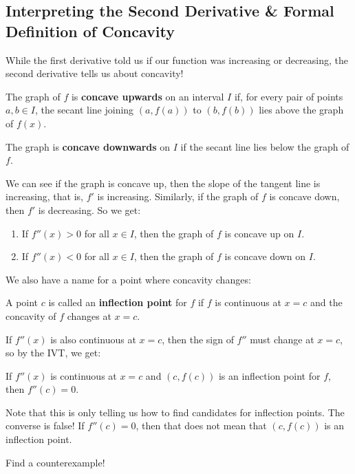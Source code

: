 \subsection{Interpreting the Second Derivative \& Formal Definition of Concavity}
While the first derivative told us if our function was increasing or decreasing, the
second derivative tells us about concavity!
\begin{Definition}{}{}
    The graph of $ f $ is \textbf{concave upwards} on an interval $ I $ if,
    for every pair of points $ a,b\in I $, the secant line joining
    $ (a,f(a)) $ to $ (b,f(b)) $
    lies above the graph of $ f(x) $.

    The graph is \textbf{concave downwards} on $ I $ if the secant line lies below the graph of $ f $.
\end{Definition}
We can see if the graph is concave up, then the slope of the tangent line is increasing, that is, $ f' $
is increasing. Similarly, if the graph of $ f $ is concave down, then $ f' $ is decreasing. So we get:
\begin{Theorem}{}{}
    \begin{enumerate}[(1)]
        \item If $ f''(x)>0 $ for all $ x\in I $, then the graph of $ f $ is concave up on $ I $.
        \item If $ f''(x)<0 $ for all $ x\in I $, then the graph of $ f $ is concave down on $ I $.
    \end{enumerate}
\end{Theorem}
We also have a name for a point where concavity changes:
\begin{Definition}{}{}
    A point $ c $ is called an \textbf{inflection point} for $ f $ if $ f $
    is continuous at $ x=c $ and the concavity of $ f $ changes at $ x=c $.
\end{Definition}
If $ f''(x) $ is also continuous at $ x=c $, then the sign of $ f'' $ must change at $ x=c $,
so by the IVT, we get:
\begin{Theorem}{}{}
    If $ f''(x) $ is continuous at $ x=c $ and $ (c,f(c)) $ is an inflection point for $ f $,
    then $ f''(c)=0 $.
\end{Theorem}
\begin{Remark}{}{}
    Note that this is only telling us how to find candidates for inflection points. The converse
    is false! If $ f''(c)=0 $, then that does not mean that $ (c,f(c)) $ is an inflection point.
    \begin{Exercise}{}{}
        Find a counterexample!
    \end{Exercise}
\end{Remark}
